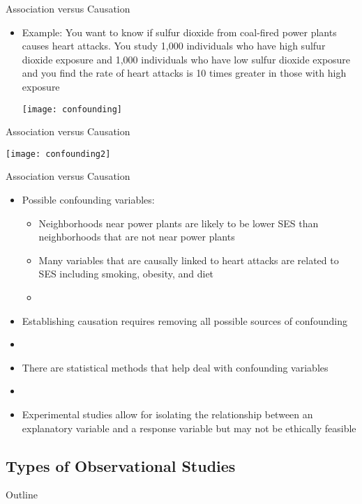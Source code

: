 \documentclass[xcolor=dvipsnames]{beamer}
\begin{document}
\begin{frame}{Association versus Causation}
\begin{itemize}
	\item Example: You want to know if sulfur dioxide from coal-fired power plants causes heart attacks. You study 1,000 individuals who have high sulfur dioxide exposure and 1,000 individuals who have low sulfur dioxide exposure and you find the rate of heart attacks is 10 times greater in those with high exposure
	\begin{center}
		\texttt{[image: confounding]}
	\end{center}
\end{itemize}
\end{frame}

\begin{frame}{Association versus Causation}
	\begin{center}
		\texttt{[image: confounding2]}
	\end{center}
\end{frame}

\begin{frame}{Association versus Causation}
	\begin{itemize}
		\item Possible confounding variables: \pause
		\begin{itemize}
			\item Neighborhoods near power plants are likely to be lower SES than neighborhoods that are not near power plants \pause
			\item Many variables that are causally linked to heart attacks are related to SES including smoking, obesity, and diet \pause
			\item[]
		\end{itemize}
		\item Establishing causation requires removing all possible sources of confounding \pause
		\item[]
		\item There are statistical methods that help deal with confounding variables \pause
		\item[]
		\item Experimental studies allow for isolating the relationship between an explanatory variable and a response variable but may not be ethically feasible 
	\end{itemize}
\end{frame}

\subsection{Types of Observational Studies}
\begin{frame}{Outline}
\tableofcontents[currentsection,subsectionstyle=show/shaded/hide]
\end{frame}
\end{document}
